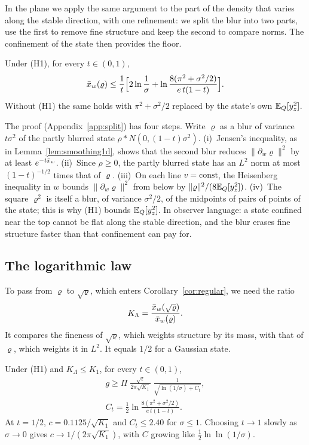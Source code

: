 In the plane we apply the same argument to the part of the density that varies along the stable direction, with one refinement: we split the blur into two parts, use the first to remove fine structure and keep the second to compare norms. The confinement of the state then provides the floor.

\begin{lemma}
\label{lem:split}
Under (H1), for every $t \in (0,1)$,
\begin{equation}
\bar{x}_w(\varrho) \leq \frac{1}{t}\Big[2\ln\frac1\sigma + \ln\frac{8(\pi^2 + \sigma^2/2)}{e\,t(1-t)}\Big].
\label{eq:split}
\end{equation}
Without (H1) the same holds with $\pi^2 + \sigma^2/2$ replaced by the state's own $\mathbb{E}_Q[y_z^2]$.
\end{lemma}

The proof (Appendix~\ref{app:split}) has four steps. Write $\varrho$ as a blur of variance $t\sigma^2$ of the partly blurred state $\rho * N(0,(1-t)\sigma^2)$. (i)~Jensen's inequality, as in Lemma~\ref{lem:smoothing1d}, shows that the second blur reduces $\|\partial_w\varrho\|^2$ by at least $e^{-t\bar{x}_w}$. (ii)~Since $\rho \geq 0$, the partly blurred state has an $L^2$ norm at most $(1-t)^{-1/2}$ times that of $\varrho$. (iii)~On each line $v = \text{const}$, the Heisenberg inequality in $w$ bounds $\|\partial_w\varrho\|^2$ from below by $\|\varrho\|^2/(8\mathbb{E}_Q[y_z^2])$. (iv)~The square $\varrho^2$ is itself a blur, of variance $\sigma^2/2$, of the midpoints of pairs of points of the state; this is why (H1) bounds $\mathbb{E}_Q[y_z^2]$. In observer language: a state confined near the top cannot be flat along the stable direction, and the blur erases fine structure faster than that confinement can pay for.

\subsection{The logarithmic law}

To pass from $\varrho$ to $\sqrt\varrho$, which enters Corollary~\ref{cor:regular}, we need the ratio
\begin{equation}
K_\Lambda = \frac{\bar{x}_w(\sqrt\varrho)}{\bar{x}_w(\varrho)} .
\end{equation}
It compares the fineness of $\sqrt\varrho$, which weights structure by its mass, with that of $\varrho$, which weights it in $L^2$. It equals $1/2$ for a Gaussian state.

\begin{theorem}
\label{thm:log}
Under (H1) and $K_\Lambda \leq K_1$, for every $t \in (0,1)$,
\begin{gather}
g \geq \Pi\;\frac{\sqrt t}{2\pi\sqrt{K_1}}\;\frac{1}{\sqrt{\ln(1/\sigma) + C_t}}, \label{eq:log}\\
C_t = \frac12\ln\frac{8(\pi^2 + \sigma^2/2)}{e\,t(1-t)} . \nonumber
\end{gather}
At $t = 1/2$, $c = 0.1125/\sqrt{K_1}$ and $C_t \leq 2.40$ for $\sigma \leq 1$. Choosing $t \to 1$ slowly as $\sigma \to 0$ gives $c \to 1/(2\pi\sqrt{K_1})$, with $C$ growing like $\frac12\ln\ln(1/\sigma)$.
\end{theorem}

